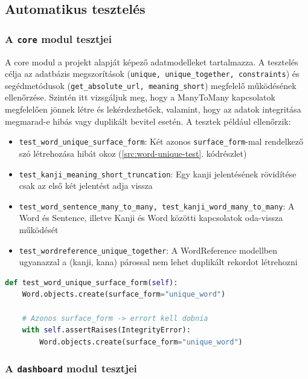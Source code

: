 \subsection{Automatikus tesztelés}

\subsubsection{A \texttt{core} modul tesztjei}

A core modul a projekt alapját képező adatmodelleket tartalmazza. A tesztelés célja az adatbázis megszorítások (\texttt{unique, unique\_together, constraints}) és segédmetódusok (\texttt{get\_absolute\_url, meaning\_short}) megfelelő működésének ellenőrzése. Szintén itt vizsgáljuk meg, hogy a ManyToMany kapcsolatok megfelelően jönnek létre és lekérdezhetőek, valamint, hogy az adatok integritása megmarad-e hibás vagy duplikált bevitel esetén. A tesztek például ellenőrzik: 
\begin{itemize}
  \item \texttt{test\_word\_unique\_surface\_form}: Két azonos \texttt{surface\_form}-mal rendelkező szó létrehozása hibát okoz (\ref{src:word-unique-test}. kódrészlet)
  
  \item \texttt{test\_kanji\_meaning\_short\_truncation}: Egy kanji jelentésének rövidítése csak az első két jelentést adja vissza 
  
  \item \texttt{test\_word\_sentence\_many\_to\_many, test\_kanji\_word\_many\_to\_many}: A Word és Sentence, illetve Kanji és Word közötti kapcsolatok oda-vissza működését
    
  \item \texttt{test\_wordreference\_unique\_together}: A WordReference modellben ugyanazzal a (kanji, kana) párossal nem lehet duplikált rekordot létrehozni
\end{itemize}


\begin{lstlisting}[language=Python]
def test_word_unique_surface_form(self):
    Word.objects.create(surface_form="unique_word")

    # Azonos surface_form -> errort kell dobnia
    with self.assertRaises(IntegrityError):
        Word.objects.create(surface_form="unique_word")
\end{lstlisting}

\subsubsection{A \texttt{dashboard} modul tesztjei}

